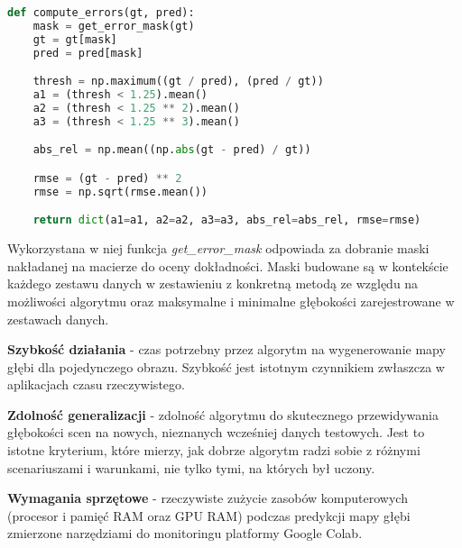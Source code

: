 \begin{lstlisting}[style=EEStyle,language=python,numbers=none,frame=none]
def compute_errors(gt, pred):
    mask = get_error_mask(gt)
    gt = gt[mask]
    pred = pred[mask]

    thresh = np.maximum((gt / pred), (pred / gt))
    a1 = (thresh < 1.25).mean()
    a2 = (thresh < 1.25 ** 2).mean()
    a3 = (thresh < 1.25 ** 3).mean()

    abs_rel = np.mean((np.abs(gt - pred) / gt))

    rmse = (gt - pred) ** 2
    rmse = np.sqrt(rmse.mean())

    return dict(a1=a1, a2=a2, a3=a3, abs_rel=abs_rel, rmse=rmse)
\end{lstlisting}

Wykorzystana w niej funkcja \textit{get\_error\_mask} odpowiada za dobranie maski nakładanej na macierze do oceny dokładności. Maski budowane są w kontekście każdego zestawu danych w zestawieniu z konkretną metodą ze względu na możliwości algorytmu oraz maksymalne i minimalne głębokości zarejestrowane w zestawach danych.

\textbf{Szybkość działania} - czas potrzebny przez algorytm na wygenerowanie mapy głębi dla pojedynczego obrazu. Szybkość jest istotnym czynnikiem zwłaszcza w aplikacjach czasu rzeczywistego.

\textbf{Zdolność generalizacji} - zdolność algorytmu do skutecznego przewidywania głębokości scen na nowych, nieznanych wcześniej danych testowych. Jest to istotne kryterium, które mierzy, jak dobrze algorytm radzi sobie z różnymi scenariuszami i warunkami, nie tylko tymi, na których był uczony.

\textbf{Wymagania sprzętowe} - rzeczywiste zużycie zasobów komputerowych (procesor i pamięć RAM oraz GPU RAM) podczas predykcji mapy głębi zmierzone narzędziami do monitoringu platformy Google Colab.

